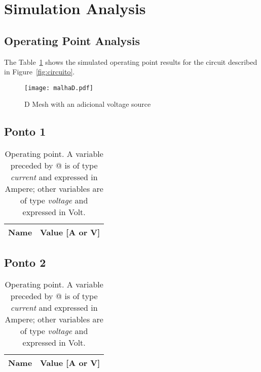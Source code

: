 \section{Simulation Analysis}
\label{sec:simulation}

\subsection{Operating Point Analysis}


The Table~\ref{tab:op1} shows the simulated operating point results for the circuit described in Figure~\ref{fig:circuito}.

\begin{figure}[H] \centering
\texttt{[image: malhaD.pdf]}
\caption{D Mesh with an adicional voltage source} %
\label{fig:malhaD}
\end{figure}


\subsection{Ponto 1}

\begin{table}[H]
  \centering
  \begin{tabular}{|l|r|}
    \hline    
    {\bf Name} & {\bf Value [A or V]} \\ \hline
    
  \end{tabular}
  \caption{Operating point. A variable preceded by @ is of type {\em current}
    and expressed in Ampere; other variables are of type {\it voltage} and expressed in
    Volt.}
  \label{tab:op1}
\end{table}

\subsection{Ponto 2}

\begin{table}[H]
  \centering
  \begin{tabular}{|l|r|}
    \hline    
    {\bf Name} & {\bf Value [A or V]} \\ \hline
    
  \end{tabular}
  \caption{Operating point. A variable preceded by @ is of type {\em current}
    and expressed in Ampere; other variables are of type {\it voltage} and expressed in
    Volt.}
  \label{tab:op2}
\end{table}

